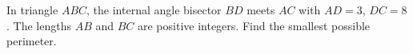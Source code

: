 In triangle $ABC$, the internal angle bisector $BD$ meets $AC$ with $AD=3$, $DC=8$. The lengths $AB$ and $BC$ are positive integers. Find the smallest possible perimeter.
